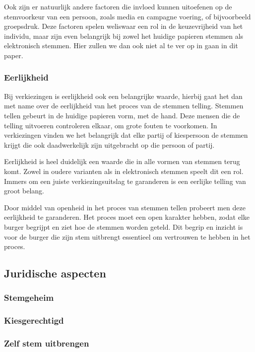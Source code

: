\documentclass[a4paper]{article}
\begin{document}
Ook zijn er natuurlijk andere factoren die invloed kunnen uitoefenen op de stemvoorkeur van een persoon, zoals media en campagne voering, of bijvoorbeeld groepsdruk.
Deze factoren spelen weliswaar een rol in de keuzevrijheid van het individu, maar zijn even belangrijk bij zowel het huidige papieren stemmen als elektronisch stemmen.
Hier zullen we dan ook niet al te ver op in gaan in dit paper.

\subsubsection{Eerlijkheid}
Bij verkiezingen is eerlijkheid ook een belangrijke waarde, hierbij gaat het dan met name over de eerlijkheid van het proces van de stemmen telling.
Stemmen tellen gebeurt in de huidige papieren vorm, met de hand.
Deze mensen die de telling uitvoeren controleren elkaar, om grote fouten te voorkomen.
In verkiezingen vinden we het belangrijk dat elke partij of kiespersoon de stemmen krijgt die ook daadwerkelijk zijn uitgebracht op die persoon of partij.

Eerlijkheid is heel duidelijk een waarde die in alle vormen van stemmen terug komt.
Zowel in oudere varianten als in elektronisch stemmen speelt dit een rol.
Immers om een juiste verkiezingsuitslag te garanderen is een eerlijke telling van groot belang.

Door middel van openheid in het proces van stemmen tellen probeert men deze eerlijkheid te garanderen.
Het proces moet een open karakter hebben, zodat elke burger begrijpt en ziet hoe de stemmen worden geteld.
Dit begrip en inzicht is voor de burger die zijn stem uitbrengt essentieel om vertrouwen te hebben in het proces.

\subsection{Juridische aspecten}

\subsubsection{Stemgeheim}

\subsubsection{Kiesgerechtigd}

\subsubsection{Zelf stem uitbrengen}
\end{document}
